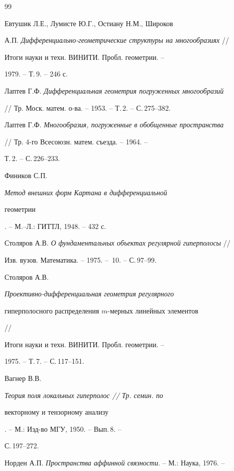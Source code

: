 \begin{thebibliography}{99} 


 




Евтушик Л.Е., Лумисте Ю.Г., Остиану Н.М., Широков  


А.П. {\em Дифференциально-геометрические структуры на многообразиях} // 


Итоги науки и техн. ВИНИТИ. Пробл. геометрии. -- 


1979. -- Т.\,9. -- 246 с. 




Лаптев Г.Ф. {\em Дифференциальная геометрия погруженных многообразий} 


// Тр. Моск. матем. о-ва. -- 1953. -- Т.\,2. -- С.\,275--382.




Лаптев Г.Ф. {\em Многообразия, погруженные в обобщенные пространства}


// Тр. 4-го Всесоюзн. матем. съезда. -- 1964. -- 


Т.\,2. -- С.\,226--233. 




Фиников С.П. {\em Метод внешних форм Картана в дифференциальной 


геометрии}. -- М.--Л.: ГИТТЛ, 1948. -- 432 с. 




Столяров А.В. {\em О фундаментальных объектах регулярной гиперполосы} // 


Изв. вузов. Математика. -- 1975. -- \No\,10. -- С.\,97--99. 




Столяров А.В. {\em Проективно-дифференциальная геометрия регулярного 


гиперполосного распределения $m$-мерных линейных элементов} // 


Итоги науки и техн. ВИНИТИ. Пробл. геометрии. -- 


1975. -- Т.\,7. -- С.\,117--151. 




Вагнер В.В. {\em Теория поля локальных гиперполос // Тр. семин. по  


векторному и тензорному анализу}. -- М.: Изд-во МГУ, 1950. -- Вып.\,8. -- 


С.\,197--272. 




Норден А.П. {\em Пространства аффинной связности}. -- М.: Наука, 1976. -- 



\end{thebibliography}
